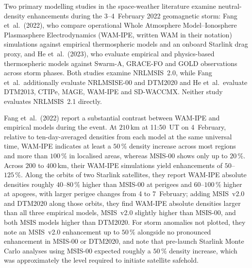 \documentclass[12pt]{article}
\newcommand{\unit}[1]{\,\mathrm{#1}}
\begin{document}
Two primary modelling studies in the space-weather literature examine neutral-density enhancements during the 3--4~February 2022 geomagnetic storm: Fang et~al.\ (2022), who compare operational Whole Atmosphere Model--Ionosphere Plasmasphere Electrodynamics (WAM-IPE, written WAM in their notation) simulations against empirical thermospheric models and an onboard Starlink drag proxy, and He et~al.\ (2023), who evaluate empirical and physics-based thermospheric models against Swarm-A, GRACE-FO and GOLD observations across storm phases. Both studies examine NRLMSIS~2.0, while Fang et~al.\ additionally evaluate NRLMSISE-00 and DTM2020 and He et~al.\ evaluate DTM2013, CTIPe, MAGE, WAM-IPE and SD-WACCMX. Neither study evaluates NRLMSIS~2.1 directly.

Fang et~al.\ (2022) report a substantial contrast between WAM-IPE and empirical models during the event. At $210\unit{km}$ at 11:50~UT on 4~February, relative to ten-day-averaged densities from each model at the same universal time, WAM-IPE indicates at least a $50\,\%$ density increase across most regions and more than $100\,\%$ in localised areas, whereas MSIS-00 shows only up to $20\,\%$. Across $200$ to $400\unit{km}$, their WAM-IPE simulations yield enhancements of $50$--$125\,\%$. Along the orbits of two Starlink satellites, they report WAM-IPE absolute densities roughly $40$--$80\,\%$ higher than MSIS-00 at perigees and $60$--$100\,\%$ higher at apogees, with larger perigee changes from 4 to 7~February; adding MSIS~v2.0 and DTM2020 along those orbits, they find WAM-IPE absolute densities larger than all three empirical models, MSIS~v2.0 slightly higher than MSIS-00, and both MSIS models higher than DTM2020. For storm anomalies not plotted, they note an MSIS~v2.0 enhancement up to $50\,\%$ alongside no pronounced enhancement in MSIS-00 or DTM2020, and note that pre-launch Starlink Monte Carlo analyses using MSIS-00 expected roughly a $50\,\%$ density increase, which was approximately the level required to initiate satellite safehold.
\end{document}
